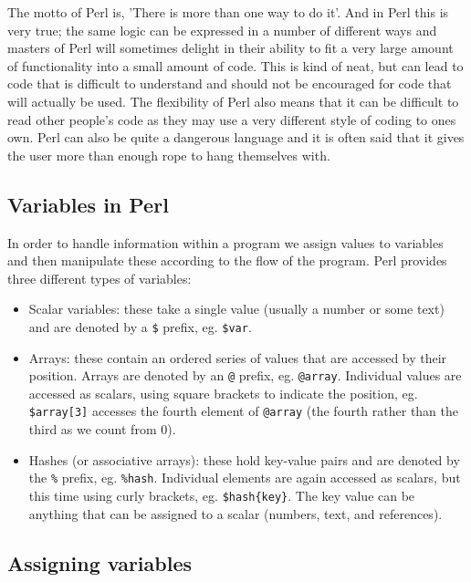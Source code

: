 \documentclass[11pt]{article}
\begin{document}
The motto of Perl is, 'There is more than one way to do it'. And in Perl
this is very true; the same logic can be expressed in a number of
different ways and masters of Perl will sometimes delight in their
ability to fit a very large amount of functionality into a small amount
of code. This is kind of neat, but can lead to code that is difficult to
understand and should not be encouraged for code that will
actually be used. The flexibility of Perl also means that it can be
difficult to read other people's code as they may use a very different
style of coding to ones own. Perl can also be quite a dangerous language
and it is often said that it gives the user more than enough rope to
hang themselves with.

\subsection{Variables in Perl}
\label{sec:orgheadline26}

In order to handle information within a program we assign values to
variables and then manipulate these according to the flow of the
program. Perl provides three different types of variables:

\begin{itemize}
\item Scalar variables: these take a single value (usually a number or some text) 
and are denoted by a \texttt{\$} prefix, eg. \texttt{\$var}.

\item Arrays: these contain an ordered series of values that are accessed by their
position. Arrays are denoted by an \texttt{@} prefix, eg. \texttt{@array}.
Individual values are accessed as scalars, using square brackets to
indicate the position, eg. \texttt{\$array[3]} accesses the fourth element of
\texttt{@array} (the fourth rather than the third as we count from 0).

\item Hashes (or associative arrays): these hold key-value pairs and are
denoted by the \texttt{\%} prefix, eg. \texttt{\%hash}. Individual elements are again
accessed as scalars, but this time using curly brackets, eg.
\texttt{\$hash\{key\}}. The key value can be anything that can be assigned to a
scalar (numbers, text, and references).
\end{itemize}

\subsection{Assigning variables}
\label{sec:orgheadline27}
\end{document}
